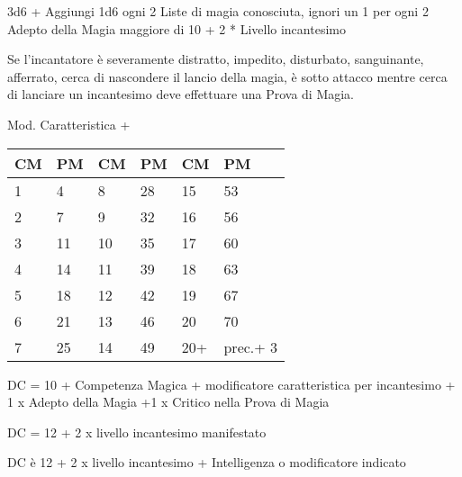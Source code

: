 \documentclass[landscape,10pt,a4paper]{article}
\begin{document}
\begin{multicols}{2}
\begin{dmbox}[title=Prova di Magia - pagina \pageref{magieprovadimagia}]
3d6 + Aggiungi 1d6 ogni 2 Liste di magia conosciuta, ignori un 1 per ogni 2 Adepto della Magia maggiore di 10 + 2 * Livello incantesimo\\
\end{dmbox}

\begin{dmbox}[title=Distratto - pagina \pageref{magiedistratto}]
Se l'incantatore è severamente distratto, impedito, disturbato, sanguinante, afferrato, cerca di nascondere il lancio della magia, è sotto attacco mentre cerca di lanciare un incantesimo deve effettuare una Prova di Magia.
\end{dmbox}


\begin{dmbox}[title=Punti Magia - pagina \pageref{magiepuntimagia}]

Mod. Caratteristica + \\

\noindent\begin{tabularx}{0.45\textwidth}{XX|XX|XX}
\textbf{CM} & \textbf{PM}&\textbf{CM} & \textbf{PM}&\textbf{CM} & \textbf{PM}\\
\hline
\hline
1&	4  &	8&	28&	15&	53\\
2&	7  &	9&	32&	16&	56\\
3&	11 &	10&	35&	17&	60\\
4&	14 &	11&	39&	18&	63\\
5&	18 &	12&	42&	19&	67\\
6&	21 &	13&	46&	20&	70\\
7&	25 & 	14&	49&	20+&	prec.+ 3
\end{tabularx}

\end{dmbox}


\begin{dmbox}[title=Tiro Salvezza Incantesimo - pagina \pageref{magietirosalvezza}]
DC = 10 + Competenza Magica + modificatore caratteristica per incantesimo + 1 x Adepto della Magia +1 x Critico nella Prova di Magia
\end{dmbox}


\begin{dmbox}[title=Tiro Salvezza Magia da Oggetto - pagina \pageref{tirosalvezzaincoggetto}]
DC = 12 + 2 x livello incantesimo manifestato
\end{dmbox}

\begin{dmbox}[title=Tiro Salvezza Incantesimo Mostro - pagina \pageref{tirosalvezzainccmostro}]
DC è 12 + 2 x livello incantesimo + Intelligenza o modificatore indicato
\end{dmbox}


\end{multicols}
\end{document}
